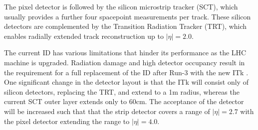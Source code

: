 The pixel detector is followed by the silicon microstrip tracker (SCT), which usually provides a further four spacepoint measurements per track. These silicon detectors are complemented by the Transition Radiation Tracker (TRT), which enables radially extended track reconstruction up to $ \lvert \eta \rvert = 2.0$.

The current ID has various limitations that hinder its performance as the LHC machine is upgraded. Radiation damage and high detector occupancy result in the requirement for a full replacement of the ID after Run-3 with the new ITk \cite{pileup,itk-strip}. One significant change in the detector layout is that the ITk will consist only of silicon detectors, replacing the TRT, and extend to a 1m radius, whereas the current SCT outer layer extends only to 60cm. The acceptance of the detector will be increased such that that the strip detector covers a range of $ \lvert \eta \rvert = 2.7$ with the pixel detector extending the range to $ \lvert \eta \rvert = 4.0$.



